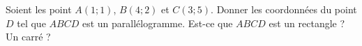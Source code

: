 
\begin{exercice}\label{exosmath-0646}

    Soient les point \( A(1;1)\), \( B(4;2)\) et \( C(3;5)\). Donner les coordonnées du point \( D\) tel que \( ABCD\) est un parallélogramme. Est-ce que \( ABCD\) est un rectangle ? Un carré ?

\end{exercice}
